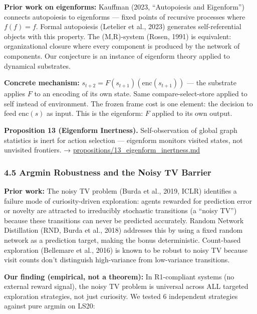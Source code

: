\documentclass[
  11pt,
]{article}
\begin{document}
\textbf{Prior work on eigenforms:} Kauffman (2023, ``Autopoiesis and
Eigenform'') connects autopoiesis to eigenforms --- fixed points of
recursive processes where \(f(f) = f\). Formal autopoiesis (Letelier et
al., 2023) generates self-referential objects with this property. The
(M,R)-system (Rosen, 1991) is equivalent: organizational closure where
every component is produced by the network of components. Our conjecture
is an instance of eigenform theory applied to dynamical substrates.

\textbf{Concrete mechanism:}
\(s_{t+2} = F(s_{t+1})(\text{enc}(s_{t+1}))\) --- the substrate applies
\(F\) to an encoding of its own state. Same compare-select-store applied
to self instead of environment. The frozen frame cost is one element:
the decision to feed \(\text{enc}(s)\) as input. This is the eigenform:
\(F\) applied to its own output.

\textbf{Proposition 13 (Eigenform Inertness).} Self-observation of
global graph statistics is inert for action selection --- eigenform
monitors visited states, not unvisited frontiers. →
\url{propositions/13_eigenform_inertness.md}

\subsubsection{4.5 Argmin Robustness and the Noisy TV
Barrier}\label{argmin-robustness-and-the-noisy-tv-barrier}

\textbf{Prior work:} The noisy TV problem (Burda et al., 2019, ICLR)
identifies a failure mode of curiosity-driven exploration: agents
rewarded for prediction error or novelty are attracted to irreducibly
stochastic transitions (a ``noisy TV'') because these transitions can
never be predicted accurately. Random Network Distillation (RND, Burda
et al., 2018) addresses this by using a fixed random network as a
prediction target, making the bonus deterministic. Count-based
exploration (Bellemare et al., 2016) is known to be robust to noisy TV
because visit counts don't distinguish high-variance from low-variance
transitions.

\textbf{Our finding (empirical, not a theorem):} In R1-compliant systems
(no external reward signal), the noisy TV problem is universal across
ALL targeted exploration strategies, not just curiosity. We tested 6
independent strategies against pure argmin on LS20:
\end{document}
